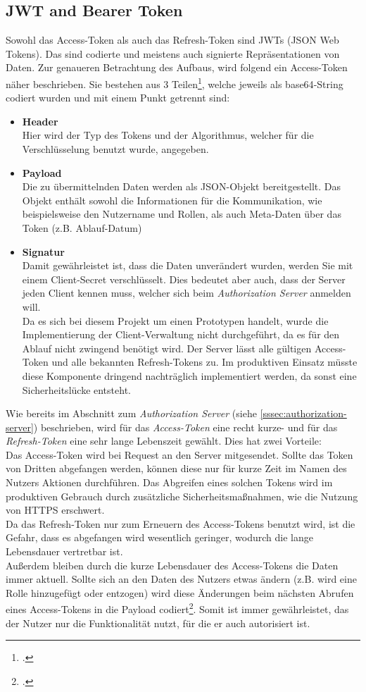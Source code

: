 \subsection{JWT and Bearer Token}
\label{ssec:jwt-bearer}
Sowohl das Access-Token als auch das Refresh-Token sind JWTs (JSON Web Tokens). Das sind codierte und meistens auch signierte Repräsentationen von Daten. Zur genaueren Betrachtung des Aufbaus, wird folgend ein Access-Token näher beschrieben. Sie bestehen aus 3 Teilen\footcite[S. 289]{book:AngularJs:Steyer2015}, welche jeweils als \ac{base64}-String codiert wurden und mit einem Punkt getrennt sind:
\begin{itemize}
\item \textbf{Header}\\Hier wird der Typ des Tokens und der Algorithmus, welcher für die Verschlüsselung benutzt wurde, angegeben. 
\item \textbf{Payload} \\Die zu übermittelnden Daten werden als JSON-Objekt bereitgestellt. Das Objekt enthält sowohl die Informationen für die Kommunikation, wie beispielsweise den Nutzername und Rollen, als auch Meta-Daten über das Token (z.B. Ablauf-Datum)
\item \textbf{Signatur}\\Damit gewährleistet ist, dass die Daten unverändert wurden, werden Sie mit einem Client-Secret verschlüsselt. Dies bedeutet aber auch, dass der Server jeden Client kennen muss, welcher sich beim \textit{Authorization Server} anmelden will. \\Da es sich bei diesem Projekt um einen Prototypen handelt, wurde die Implementierung der Client-Verwaltung nicht durchgeführt, da es für den Ablauf nicht zwingend benötigt wird. Der Server lässt alle gültigen Access-Token und alle bekannten Refresh-Tokens zu. Im produktiven Einsatz müsste diese Komponente dringend nachträglich implementiert werden, da sonst eine Sicherheitslücke entsteht.
\end{itemize}
Wie bereits im Abschnitt zum \textit{Authorization Server} (siehe \ref{sssec:authorization-server}) beschrieben, wird für das \textit{Access-Token} eine recht kurze- und für das \textit{Refresh-Token} eine sehr lange Lebenszeit gewählt. Dies hat zwei Vorteile:\\
Das Access-Token wird bei Request an den Server mitgesendet. Sollte das Token von Dritten abgefangen werden, können diese nur für kurze Zeit im Namen des Nutzers Aktionen durchführen. Das Abgreifen eines solchen Tokens wird im produktiven Gebrauch durch zusätzliche Sicherheitsmaßnahmen, wie die Nutzung von \ac{HTTPS} erschwert. \\Da das Refresh-Token nur zum Erneuern des Access-Tokens benutzt wird, ist die Gefahr, dass es abgefangen wird wesentlich geringer, wodurch die lange Lebensdauer vertretbar ist. \\
Außerdem bleiben durch die kurze Lebensdauer des Access-Tokens die Daten immer aktuell. Sollte sich an den Daten des Nutzers etwas ändern (z.B. wird eine Rolle hinzugefügt oder entzogen) wird diese Änderungen beim nächsten Abrufen eines Access-Tokens in die Payload codiert\footcite{online:Implemented_OAuth_RefreshToken}. Somit ist immer gewährleistet, das der Nutzer nur die Funktionalität nutzt, für die er auch autorisiert ist. 
